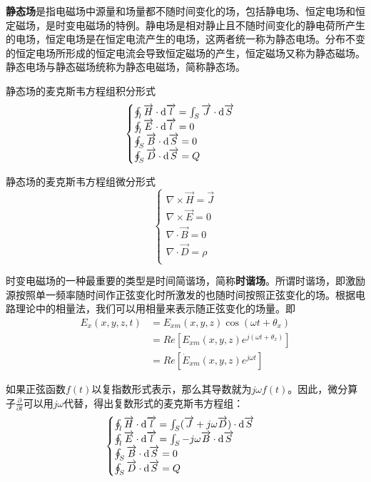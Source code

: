 \documentclass[UTF8,a4paper,11pt]{article}
\begin{document}
\textbf{静态场}是指电磁场中源量和场量都不随时间变化的场，包括静电场、恒定电场和恒定磁场，是时变电磁场的特例。静电场是相对静止且不随时间变化的静电荷所产生的电场，恒定电场是在恒定电流产生的电场，这两者统一称为静态电场。分布不变的恒定电场所形成的恒定电流会导致恒定磁场的产生，恒定磁场又称为静态磁场。静态电场与静态磁场统称为静态电磁场，简称静态场。

静态场的麦克斯韦方程组积分形式
\begin{equation}
\begin{cases}
\oint_l\overrightarrow{H}\cdot{\rm d}\overrightarrow{l}=\int_S\overrightarrow{J}\cdot{\rm d}\overrightarrow{S}\\
\oint_l\overrightarrow{E}\cdot{\rm d}\overrightarrow{l}=0\\
\oint_S\overrightarrow{B}\cdot{\rm d}\overrightarrow{S}=0\\
\oint_S\overrightarrow{D}\cdot{\rm d}\overrightarrow{S}=Q\\
\end{cases}
\end{equation}

静态场的麦克斯韦方程组微分形式
\begin{equation}
\begin{cases}
\nabla\times\overrightarrow{H}=\overrightarrow{J}\\
\nabla\times\overrightarrow{E}=0\\
\nabla\cdot\overrightarrow{B}=0\\
\nabla\cdot\overrightarrow{D}=\rho\\
\end{cases}
\end{equation}

时变电磁场的一种最重要的类型是时间简谐场，简称\textbf{时谐场}。所谓时谐场，即激励源按照单一频率随时间作正弦变化时所激发的也随时间按照正弦变化的场。根据电路理论中的相量法，我们可以用相量来表示随正弦变化的场量。即
\begin{equation}
\begin{aligned}
E_x(x,y,z,t)&=E_{xm}(x,y,z)\cos(\omega t+\theta_x)\\
&=Re[E_{xm}(x,y,z)e^{j(\omega t+\theta_x)}]\\
&=Re[\dot{E}_{xm}(x,y,z)e^{j\omega t}]
\end{aligned}
\end{equation}

如果正弦函数$f(t)$以复指数形式表示，那么其导数就为$j\omega f(t)$。因此，微分算子$\frac{\partial}{\partial t}$可以用$j\omega$代替，得出复数形式的麦克斯韦方程组：
\begin{equation}
\begin{cases}
\oint_l\overrightarrow{H}\cdot{\rm d}\overrightarrow{l}=\int_S(\overrightarrow{J}+j\omega\overrightarrow{D})\cdot{\rm d}\overrightarrow{S}\\
\oint_l\overrightarrow{E}\cdot{\rm d}\overrightarrow{l}=\int_S-j\omega\overrightarrow{B}\cdot{\rm d}\overrightarrow{S}\\
\oint_S\overrightarrow{B}\cdot{\rm d}\overrightarrow{S}=0\\
\oint_S\overrightarrow{D}\cdot{\rm d}\overrightarrow{S}=Q\\
\end{cases}
\end{equation}
\end{document}
